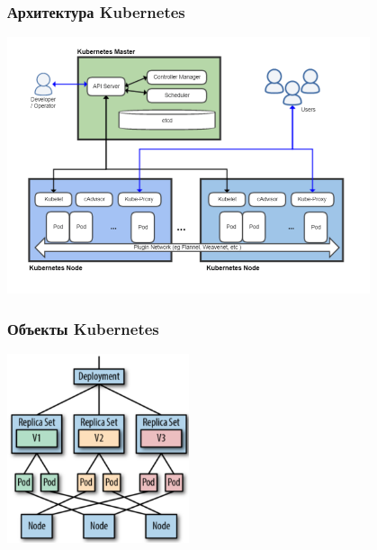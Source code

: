 \documentclass{../../slides-style}
\begin{document}
    \begin{frame}
        \frametitle{Архитектура Kubernetes}
        \begin{center}
            \includegraphics[width=0.8\textwidth]{kubernetesArchitecture.png}
        \end{center}
    \end{frame}

    \begin{frame}
        \frametitle{Объекты Kubernetes}
        \begin{center}
            \includegraphics[width=0.4\textwidth]{kubernetesObjects.png}
        \end{center}
    \end{frame}
\end{document}
